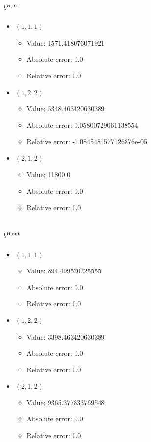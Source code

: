 \documentclass{article}%
\begin{document}
\subsection{$b^{\textsl{H},\text{in}}$}%
\begin{itemize}%
	\item $(1, 1, 1)$%
	\begin{itemize}%
		\item Value: 1571.418076071921%
		\item Absolute error: 0.0%
		\item Relative error: 0.0%
	\end{itemize}%
	\item $(1, 2, 2)$%
	\begin{itemize}%
		\item Value: 5348.463420630389%
		\item Absolute error: 0.05800729061138554%
		\item Relative error: -1.0845481577126876e-05%
	\end{itemize}%
	\item $(2, 1, 2)$%
	\begin{itemize}%
		\item Value: 11800.0%
		\item Absolute error: 0.0%
		\item Relative error: 0.0%
	\end{itemize}%
\end{itemize}%
\subsection{$b^{\textsl{H},\text{out}}$}%
\begin{itemize}%
	\item $(1, 1, 1)$%
	\begin{itemize}%
		\item Value: 894.499520225555%
		\item Absolute error: 0.0%
		\item Relative error: 0.0%
	\end{itemize}%
	\item $(1, 2, 2)$%
	\begin{itemize}%
		\item Value: 3398.463420630389%
		\item Absolute error: 0.0%
		\item Relative error: 0.0%
	\end{itemize}%
	\item $(2, 1, 2)$%
	\begin{itemize}%
		\item Value: 9365.377833769548%
		\item Absolute error: 0.0%
		\item Relative error: 0.0%
	\end{itemize}%
\end{itemize}%
\end{document}
